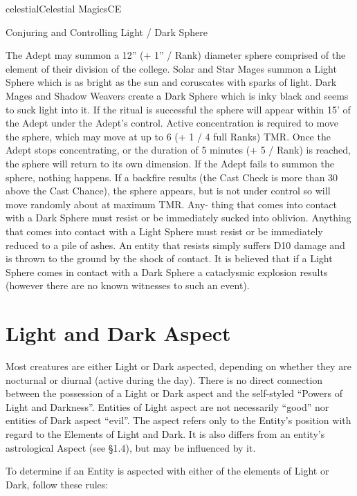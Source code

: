 \begin{College}[1.3]{celestial}{Celestial Magics}{CE}
\begin{ritual}[R-1]{Conjuring and Controlling Light / Dark Sphere}
\begin{effects}
The Adept may summon a 12” (+ 1” / Rank) diameter sphere comprised of
the element of their division of the college. Solar and Star Mages
summon a Light Sphere which is as bright as the sun and coruscates
with sparks of light.  Dark Mages and Shadow Weavers create a Dark
Sphere which is inky black and seems to suck light into it.  If the
ritual is successful the sphere will appear within 15’ of the Adept
under the Adept’s control.  Active concentration is required to move
the sphere, which may move at up to 6 (+ 1 / 4 full Ranks) TMR. Once
the Adept stops concentrating, or the duration of 5 minutes (+ 5 /
Rank) is reached, the sphere will return to its own dimension.  If the
Adept fails to summon the sphere, nothing happens.  If a backfire
results (the Cast Check is more than 30 above the Cast Chance), the
sphere appears, but is not under control so will move randomly about
at maximum TMR.  Any- thing that comes into contact with a Dark Sphere
must resist or be immediately sucked into oblivion.  Anything that
comes into contact with a Light Sphere must resist or be immediately
reduced to a pile of ashes.  An entity that resists simply suffers D10
damage and is thrown to the ground by the shock of contact.  It is
believed that if a Light Sphere comes in contact with a Dark Sphere a
cataclysmic explosion results (however there are no known witnesses to
such an event).
\end{effects}
\end{ritual}


\section{Light and Dark Aspect}

Most creatures are either Light or Dark aspected, depending on whether
they are nocturnal or diurnal (active during the day). There is no
direct connection between the possession of a Light or Dark aspect and
the self-styled “Powers of Light and Darkness”.  Entities of Light
aspect are not necessarily “good” nor entities of Dark aspect “evil”.
The aspect refers only to the Entity’s position with regard to the
Elements of Light and Dark. It is also differs from an entity’s
astrological Aspect (see §1.4), but may be influenced by it.

To determine if an Entity is aspected with either of the elements of
Light or Dark, follow these rules:


\end{College}
